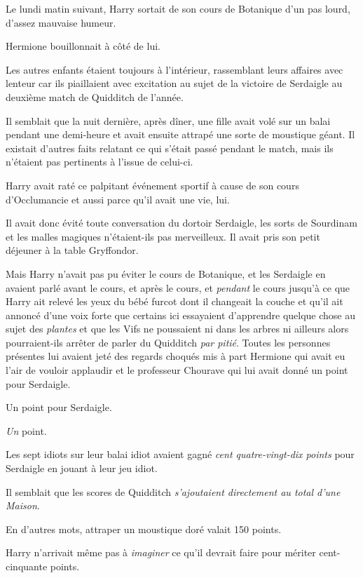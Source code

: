 \later

Le lundi matin suivant, Harry sortait de son cours de Botanique d'un pas lourd, d'assez mauvaise humeur.

Hermione bouillonnait à côté de lui.

Les autres enfants étaient toujours à l'intérieur, rassemblant leurs affaires avec lenteur car ils piaillaient avec excitation au sujet de la victoire de Serdaigle au deuxième match de Quidditch de l'année.

Il semblait que la nuit dernière, après dîner, une fille avait volé sur un balai pendant une demi-heure et avait ensuite attrapé une sorte de moustique géant. Il existait d'autres faits relatant ce qui s'était passé pendant le match, mais ils n'étaient pas pertinents à l'issue de celui-ci.

Harry avait raté ce palpitant événement sportif à cause de son cours d'Occlumancie et aussi parce qu'il avait une vie, lui.

Il avait donc évité toute conversation du dortoir Serdaigle, les sorts de Sourdinam et les malles magiques n'étaient-ils pas merveilleux. Il avait pris son petit déjeuner à la table Gryffondor.

Mais Harry n'avait pas pu éviter le cours de Botanique, et les Serdaigle en avaient parlé avant le cours, et après le cours, et \emph{pendant} le cours jusqu'à ce que Harry ait relevé les yeux du bébé furcot dont il changeait la couche et qu'il ait annoncé d'une voix forte que certains ici essayaient d'apprendre quelque chose au sujet des \emph{plantes} et que les Vifs ne poussaient ni dans les arbres ni ailleurs alors pourraient-ils arrêter de parler du Quidditch \emph{par pitié}. Toutes les personnes présentes lui avaient jeté des regards choqués mis à part Hermione qui avait eu l'air de vouloir applaudir et le professeur Chourave qui lui avait donné un point pour Serdaigle.

Un point pour Serdaigle.

\emph{Un} point.

Les sept idiots sur leur balai idiot avaient gagné \emph{cent quatre-vingt-dix points} pour Serdaigle en jouant à leur jeu idiot.

Il semblait que les scores de Quidditch \emph{s'ajoutaient directement au total d'une Maison}.

En d'autres mots, attraper un moustique doré valait 150 points.

Harry n'arrivait même pas à \emph{imaginer} ce qu'il devrait faire pour mériter cent-cinquante points.


